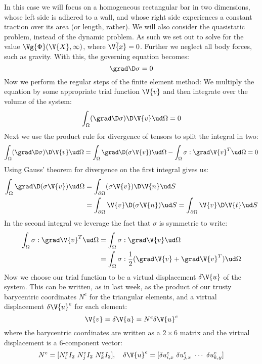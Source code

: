 \documentclass[sigconf]{acmart}
\begin{document}
In this case we will focus on a homogeneous rectangular bar in two dimensions, whose left side is adhered to a wall, and whose right side experiences a constant traction over its area (or length, rather). We will also consider the quasistatic problem, instead of the dynamic problem. As such we set out to solve for the value $ \Vg{\Phi}(\V{X}, \infty) $, where $ \ddot{\V{x}}=0 $. Further we neglect all body forces, such as gravity. With this, the governing equation becomes:
\begin{equation}\label{key}
	\grad \D \sigma = 0
\end{equation}
Now we perform the regular steps of the finite element method: We multiply the equation by some appropriate trial function $ \V{v} $ and then integrate over the volume of the system:
\begin{equation}\label{key}
	\int_{\Omega} (\grad \D \sigma) \D \V{v} \ud \Omega = 0
\end{equation}
Next we use the product rule for divergence of tensors to split the integral in two:
\begin{align}\label{key}
	\int_{\Omega} (\grad \D \sigma) \D \V{v} \ud \Omega = \int_{\Omega} \grad \D (\sigma \V{v}) \ud \Omega - \int_{\Omega} \sigma : \grad \V{v}^T \ud \Omega = 0
\end{align}
Using Gauss' theorem for divergence on the first integral gives us:
\begin{align}
	\int_{\Omega} \grad \D (\sigma \V{v}) \ud \Omega &= \int_{\partial \Omega} (\sigma \V{v}) \D \V{n} \ud S \\
	&= \int_{\partial \Omega} \V{v} \D (\sigma \V{n}) \ud S = \int_{\partial \Omega} \V{v} \D \V{t} \ud S
\end{align}
In the second integral we leverage the fact that $ \sigma $ is symmetric to write:
\begin{align}\label{key}
	\int_{\Omega} \sigma : \grad \V{v}^T \ud \Omega &= \int_{\Omega} \sigma : \grad \V{v} \ud \Omega \\
	&= \int_{\Omega} \sigma : \frac{1}{2} (\grad \V{v} + \grad \V{v}^T) \ud \Omega
\end{align}
Now we choose our trial function to be a virtual displacement $ \delta \V{u} $ of the system.  This can be written, as in last week, as the product of our trusty barycentric coordinates $ N^e $ for the triangular elements, and a virtual displacement $ \delta\V{u}^e $ for each element:
\begin{equation}\label{key}
	\V{v} = \delta \V{u} = N^e \delta\V{u}^e
\end{equation}
where the barycentric coordinates are written as a $ 2\times 6 $ matrix and the virtual displacement is a 6-component vector:
\begin{equation}\label{key}
	N^e = [N_i^e I_2\ N_j^e I_2\ N_k^e I_2], \quad \delta \V{u}^e = [\delta u^e_{i,x} \ \delta u^e_{j,x} \ \cdots \ \delta u^e_{k,y}]
\end{equation}
\end{document}
